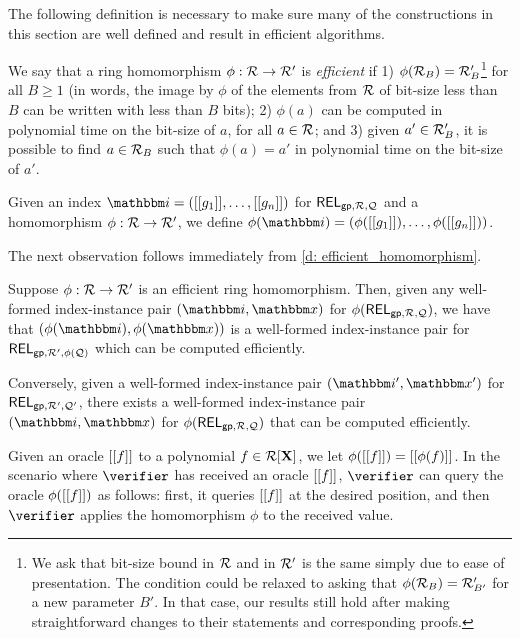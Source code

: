 \documentclass[11pt,letterpaper,usenames,dvipsnames]{article}
\newcommand{\albert}[1]{\textcolor{teal}{Albert: {#1}}}
\begin{document}
    The following definition is necessary to make sure many of the constructions in this section are well defined and result in efficient algorithms. 

    \begin{definition}\label{d: efficient_homomorphism}
        We say that a ring homomorphism $\phi:\mathcal{R} \to \mathcal{R}'$ is \emph{efficient} if 1) $\phi(\mathcal{R}_B)= \mathcal{R}_B'$\footnote{We ask that  bit-size bound in $\mathcal{R}$ and in $\mathcal{R}'$ is the same simply due to ease of presentation. The  condition could be relaxed to asking that $\phi(\mathcal{R}_B)= \mathcal{R}_{B'}'$ for a new parameter $B'$. In that case, our results still hold after making straightforward changes to their statements and corresponding proofs.} for all $B\geq 1$ (in words, the image by $\phi$ of the elements from $\mathcal{R}$ of bit-size less than $B$ can be written with less than $B$ bits); 2) $\phi(a)$ can be computed in polynomial time on the bit-size of $a$, for all $a\in \mathcal{R}$; and 3) given $a'\in \mathcal{R}_B'$, it is possible to find $a\in \mathcal{R}_B$ such that $\phi(a)=a'$ in polynomial time on the bit-size of $a'$.
    \end{definition}

    Given an index $\idx=(\oracle{g_1},\ldots, \oracle{g_n})$ for $\mathsf{REL}_{\mathsf{gp}, \mathcal{R}, \mathcal{Q}}$ and a homomorphism $\phi:\mathcal{R} \to \mathcal{R}'$, we define $\phi(\idx)=( \phi(\oracle{g_1}),\ldots, \phi(\oracle{g_n}))$.

The next observation follows immediately from \cref{d: efficient_homomorphism}.
\begin{remark}\label{r: well_formedness_preservation}
Suppose $\phi:\mathcal{R} \to \mathcal{R}'$  is an efficient ring homomorphism. Then, given any well-formed index-instance pair $(\idx,\inp)$ for $\phi(\mathsf{REL}_{\mathsf{gp},\mathcal{R},\mathcal{Q}})$, we have that $(\phi(\idx), \phi(\inp))$ is a well-formed index-instance pair for $\mathsf{REL}_{\mathsf{gp},\mathcal{R}', \phi(\mathcal{Q})}$ which can be computed efficiently. 

Conversely, given a well-formed index-instance pair $(\idx',\inp')$ for $\mathsf{REL}_{\mathsf{gp},\mathcal{R}',\mathcal{Q}'}$, there exists a well-formed index-instance pair $(\idx,\inp)$ for $\phi(\mathsf{REL}_{\mathsf{gp},\mathcal{R},\mathcal{Q}})$ that can be computed efficiently.
\end{remark}

    
    Given an oracle $[[{f}]]$ to a polynomial $f\in \mathcal{R}[\mathbf{X}]$, we let $\phi([[{f}]])= [[{\phi(f)}]]$. In the scenario where $\verifier$ has received an oracle $[[{f}]]$, $\verifier$ can query the oracle $\phi([[{f}]])$ as follows: first, it queries $[[{f}]]$ at the desired position, and then $\verifier$ applies the homomorphism $\phi$ to the received value. %
\end{document}
